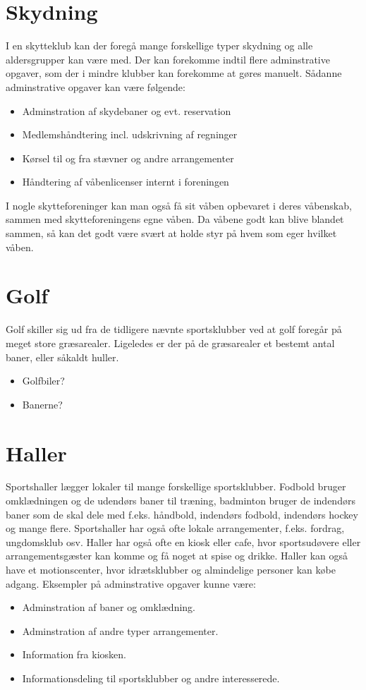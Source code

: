 \section{Skydning}
I en skytteklub kan der foregå mange forskellige typer skydning og alle aldersgrupper kan være med. Der kan forekomme indtil flere adminstrative opgaver, som der i mindre klubber kan forekomme at gøres manuelt. Sådanne adminstrative opgaver kan være følgende:
\begin{itemize}
\item Adminstration af skydebaner og evt. reservation
\item Medlemshåndtering incl. udskrivning af regninger
\item Kørsel til og fra stævner og andre arrangementer
\item Håndtering af våbenlicenser internt i foreningen
\end{itemize}
I nogle skytteforeninger kan man også få sit våben opbevaret i deres våbenskab, sammen med skytteforeningens egne våben. Da våbene godt kan blive blandet sammen, så kan det godt være svært at holde styr på hvem som eger hvilket våben.

\section{Golf}
Golf skiller sig ud fra de tidligere nævnte sportsklubber ved at golf foregår på meget store græsarealer. Ligeledes er der på de græsarealer et bestemt antal baner, eller såkaldt huller. 
\begin{itemize}
\item Golfbiler?
\item Banerne?
\end{itemize}

\section{Haller}
Sportshaller lægger lokaler til mange forskellige sportsklubber. Fodbold bruger omklædningen og de udendørs baner til træning, badminton bruger de indendørs baner som de skal dele med f.eks. håndbold, indendørs fodbold, indendørs hockey og mange flere. Sportshaller har også ofte lokale arrangementer, f.eks. fordrag, ungdomsklub osv. 
Haller har også ofte en kiosk eller cafe, hvor sportsudøvere eller arrangementsgæster kan komme og få noget at spise og drikke. 
Haller kan også have et motionscenter, hvor idrætsklubber og almindelige personer kan købe adgang. 
Eksempler på adminstrative opgaver kunne være:
\begin{itemize}
\item Adminstration af baner og omklædning.
\item Adminstration af andre typer arrangementer.
\item Information fra kiosken.
\item Informationsdeling til sportsklubber og andre interesserede.
\end{itemize}
